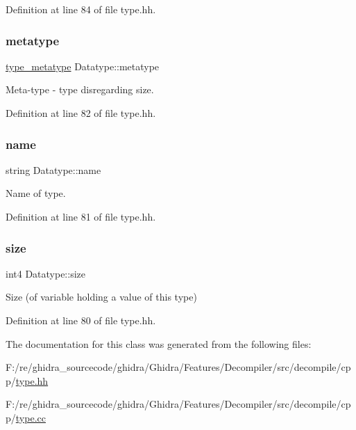Definition at line 84 of file type.\+hh.

\mbox{\label{class_datatype_a79a16cdae5aff36880bee9122889a0b9}} 
\subsubsection{\texorpdfstring{metatype}{metatype}}
{\footnotesize\ttfamily \mbox{\hyperlink{type_8hh_aef6429f2523cdf4d415ba04a0209e61f}{type\+\_\+metatype}} Datatype\+::metatype\hspace{0.3cm}{\ttfamily [protected]}}



Meta-\/type -\/ type disregarding size. 



Definition at line 82 of file type.\+hh.

\mbox{\label{class_datatype_a66d6613a73e69cd4665c90441c4613b3}} 
\subsubsection{\texorpdfstring{name}{name}}
{\footnotesize\ttfamily string Datatype\+::name\hspace{0.3cm}{\ttfamily [protected]}}



Name of type. 



Definition at line 81 of file type.\+hh.

\mbox{\label{class_datatype_a14476d90cd8993852b349b621876b292}} 
\subsubsection{\texorpdfstring{size}{size}}
{\footnotesize\ttfamily int4 Datatype\+::size\hspace{0.3cm}{\ttfamily [protected]}}



Size (of variable holding a value of this type) 



Definition at line 80 of file type.\+hh.



The documentation for this class was generated from the following files\+:\begin{DoxyCompactItemize}
\item 
F\+:/re/ghidra\+\_\+sourcecode/ghidra/\+Ghidra/\+Features/\+Decompiler/src/decompile/cpp/\mbox{\hyperlink{type_8hh}{type.\+hh}}\item 
F\+:/re/ghidra\+\_\+sourcecode/ghidra/\+Ghidra/\+Features/\+Decompiler/src/decompile/cpp/\mbox{\hyperlink{type_8cc}{type.\+cc}}\end{DoxyCompactItemize}
